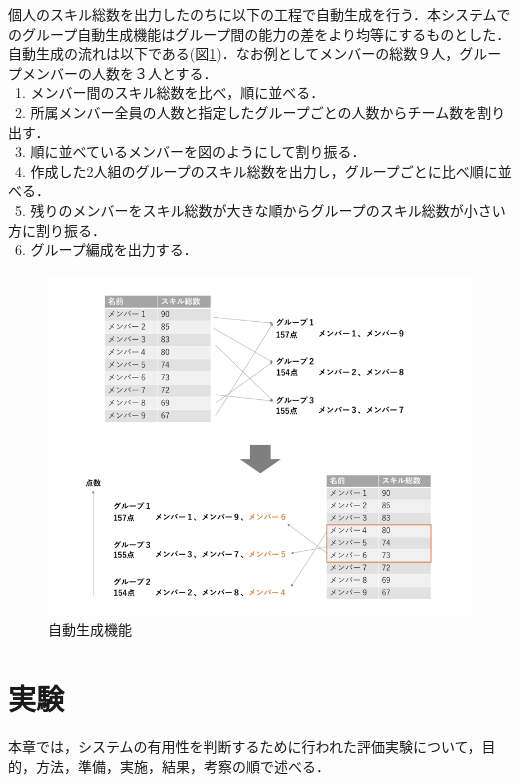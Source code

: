 \documentclass{funthesis}
\begin{document}
個人のスキル総数を出力したのちに以下の工程で自動生成を行う．本システムでのグループ自動生成機能はグループ間の能力の差をより均等にするものとした．自動生成の流れは以下である(図\ref{auto})．なお例としてメンバーの総数９人，グループメンバーの人数を３人とする．\\
\ 1. メンバー間のスキル総数を比べ，順に並べる．\\
\ 2. 所属メンバー全員の人数と指定したグループごとの人数からチーム数を割り出す．\\
\ 3. 順に並べているメンバーを図のようにして割り振る．\\
\ 4. 作成した2人組のグループのスキル総数を出力し，グループごとに比べ順に並べる．\\
\ 5. 残りのメンバーをスキル総数が大きな順からグループのスキル総数が小さい方に割り振る．\\
\ 6. グループ編成を出力する．\\
\begin{figure}[h]
 \centering
   \includegraphics[width=150mm]{figures/auto.png}
 \caption{自動生成機能}
 \label{auto}
\end{figure}





\chapter{実験}
本章では，システムの有用性を判断するために行われた評価実験について，目的，方法，準備，実施，結果，考察の順で述べる．
\end{document}
